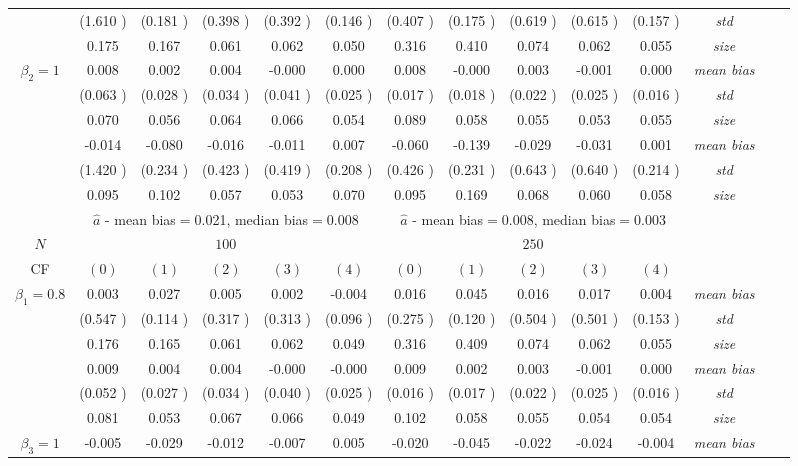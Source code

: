 \begin{table}
\begin{threeparttable}
{\begin{tabular}{|c|c|c|c|c|c|c|c|c|c|c|c|c|c|}
&(1.610 )&(0.181 )&(0.398 )&(0.392 )&(0.146 )&(0.407 )&(0.175 )&(0.619 )&(0.615 )&(0.157 )&\textit{std}\\ 
& 0.175 & 0.167 &0.061 &0.062 &0.050 &0.316& 0.410 &0.074 &0.062& 0.055 &\textit{size} \\ \midrule 
\multirow{4}{*}{$\beta_2=1$}& 0.008 & 0.002 &0.004 &-0.000 &0.000 &0.008& -0.000 &0.003 &-0.001& 0.000 &\textit{mean bias} \\ 
&(0.063 )&(0.028 )&(0.034 )&(0.041 )&(0.025 )&(0.017 )&(0.018 )&(0.022 )&(0.025 )&(0.016 )&\textit{std}\\ 
& 0.070 & 0.056 &0.064 &0.066 &0.054 &0.089& 0.058 &0.055& 0.053 &0.055 &\textit{size} \\\midrule 
\multirow{4}{*}{$\beta_3=1$}& -0.014 & -0.080 &-0.016& -0.011 &0.007 &-0.060 &-0.139 &-0.029 &-0.031& 0.001 &\textit{mean bias} \\ 
&(1.420 )&(0.234 )&(0.423 )&(0.419 )&(0.208 )&(0.426 )&(0.231 )&(0.643 )&(0.640 )&(0.214 )&\textit{std}\\ 
& 0.095 & 0.102 &0.057 &0.053 &0.070 &0.095& 0.169& 0.068 &0.060 &0.058 &\textit{size} \\\midrule 
&\multicolumn{5}{|c|}{$\hat{a}$ - mean bias$=$0.021, median bias$=$0.008 }&\multicolumn{5}{|c|}{$\hat{a}$ - mean bias$=$0.008, median bias$=$0.003 }&\\ \hline 
\cellcolor{yellow}$N$&\multicolumn{5}{|c|}{\cellcolor{yellow}$100$}&\multicolumn{5}{|c|}{\cellcolor{yellow}$250$}&\\\hline 
CF&$(0)$&$(1)$&$(2)$&$(3)$&$(4)$& $(0)$ &$(1)$&$(2)$&$(3)$&$(4)$&\\\hline 
\multirow{4}{*}{$\beta_1=0.8$}& 0.003 & 0.027 &0.005 &0.002 &-0.004 &0.016& 0.045 &0.016 &0.017& 0.004 &\textit{mean bias} \\ 
&(0.547 )&(0.114 )&(0.317 )&(0.313 )&(0.096 )&(0.275 )&(0.120 )&(0.504 )&(0.501 )&(0.153 )&\textit{std}\\ 
& 0.176 & 0.165 &0.061 &0.062 &0.049 &0.316& 0.409 &0.074 &0.062& 0.055 &\textit{size} \\\midrule 
\multirow{4}{*}{$\beta_2=1$}& 0.009 & 0.004 &0.004 &-0.000 &-0.000 &0.009& 0.002 &0.003 &-0.001& 0.000 &\textit{mean bias} \\ 
&(0.052 )&(0.027 )&(0.034 )&(0.040 )&(0.025 )&(0.016 )&(0.017 )&(0.022 )&(0.025 )&(0.016 )&\textit{std}\\ 
& 0.081 & 0.053 &0.067 &0.066 &0.049 &0.102& 0.058 &0.055& 0.054 &0.054 &\textit{size} \\ \midrule
\multirow{4}{*}{$\beta_3=1$}& -0.005 & -0.029 &-0.012& -0.007 &0.005 &-0.020 &-0.045 &-0.022 &-0.024& -0.004 &\textit{mean bias} \\ 

\end{tabular}}
\end{threeparttable}
\end{table}
